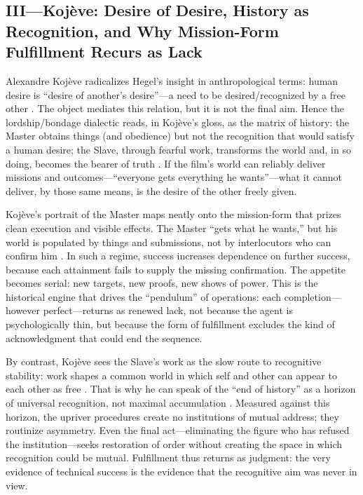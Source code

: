\subsection*{III—Koj{\`e}ve: Desire of Desire, History as Recognition, and Why Mission-Form
Fulfillment Recurs as Lack}
\label{ssec:iii-kojeve}
Alexandre Koj{\`e}ve radicalizes Hegel's insight in anthropological terms: human desire is
``desire of another's desire''—a need to be desired/recognized by a free other
\parencite[p.~6]{KojeveIRH1980}.
The object mediates this relation, but it is not the final aim. Hence the lordship/bondage
dialectic reads, in Koj{\`e}ve's gloss, as the matrix of history: the Master obtains things
(and obedience) but not the recognition that would satisfy a human desire; the Slave, through
fearful work, transforms the world and, in so doing, becomes the bearer of truth
\parencite[pp.~27--34, 158--164]{KojeveIRH1980}. If the film's world can reliably deliver
missions and outcomes—``everyone gets everything he wants''—what it cannot deliver, by those
same means, is the desire of the other freely given.

Koj{\`e}ve's portrait of the Master maps neatly onto the mission-form that prizes clean
execution and visible effects. The Master ``gets what he wants,'' but his world is populated by
things and submissions, not by interlocutors who can confirm him
\parencite[pp.~27--34]{KojeveIRH1980}. In such a regime, success increases dependence on further
success, because each attainment fails to supply the missing confirmation. The appetite becomes
serial: new targets, new proofs, new shows of power. This is the historical engine that drives
the ``pendulum'' of operations: each completion—however perfect—returns as renewed lack, not
because the agent is psychologically thin, but because the form of fulfillment excludes the kind
of acknowledgment that could end the sequence.

By contrast, Koj{\`e}ve sees the Slave's work as the slow route to recognitive stability: work
shapes a common world in which self and other can appear to each other as free
\parencite[pp.~158--164]{KojeveIRH1980}. That is why he can speak of the ``end of history'' as
a horizon of universal recognition, not maximal accumulation
\parencite[pp.~158--164]{KojeveIRH1980}. Measured against this horizon, the upriver procedures
create no institutions of mutual address; they routinize asymmetry. Even the final act—eliminating
the figure who has refused the institution—seeks restoration of order without creating the space
in which recognition could be mutual. Fulfillment thus returns as judgment: the very evidence of
technical success is the evidence that the recognitive aim was never in view.

